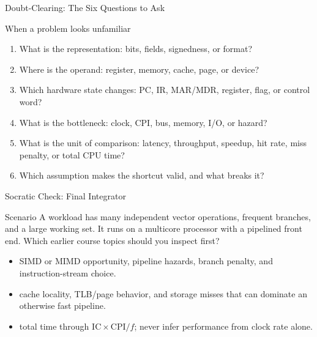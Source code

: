 \documentclass[aspectratio=169]{beamer}
\begin{document}
\begin{frame}{Doubt-Clearing: The Six Questions to Ask}
  \begin{block}{When a problem looks unfamiliar}
    \begin{enumerate}
      \item What is the representation: bits, fields, signedness, or format?
      \item Where is the operand: register, memory, cache, page, or device?
      \item Which hardware state changes: PC, IR, MAR/MDR, register, flag, or
        control word?
      \item What is the bottleneck: clock, CPI, bus, memory, I/O, or hazard?
      \item What is the unit of comparison: latency, throughput, speedup,
        hit rate, miss penalty, or total CPU time?
      \item Which assumption makes the shortcut valid, and what breaks it?
    \end{enumerate}
  \end{block}
\end{frame}

\begin{frame}{Socratic Check: Final Integrator}
  \begin{alertblock}{Scenario}
    A workload has many independent vector operations, frequent branches, and
    a large working set. It runs on a multicore processor with a pipelined
    front end. Which earlier course topics should you inspect first?
  \end{alertblock}
  \begin{itemize}
    \item {} SIMD or MIMD opportunity, pipeline hazards,
      branch penalty, and instruction-stream choice.
    \item {} cache locality, TLB/page behavior, and storage
      misses that can dominate an otherwise fast pipeline.
    \item {} total time through $\mathrm{IC}\times\mathrm{CPI}/f$;
      never infer performance from clock rate alone.
  \end{itemize}
\end{frame}
\end{document}
